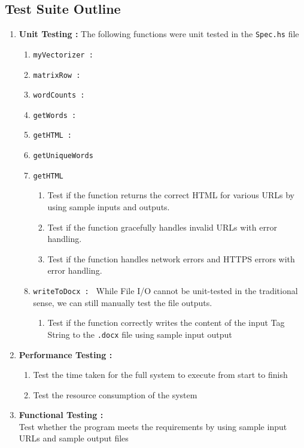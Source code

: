 \documentclass[12pt]{scrreprt}
\newcommand{\ttt}[1]{\texttt{#1}}
\begin{document}



\subsection{Test Suite Outline}

\begin{enumerate}
    \item \textbf{Unit Testing : } The following functions were unit tested in the \ttt{Spec.hs} file
    \begin{enumerate}
        \item \ttt{myVectorizer : }
        \item \ttt{matrixRow : }
        \item \ttt{wordCounts : }
        \item \ttt{getWords : }
        \item \texttt{getHTML : }
        \item \ttt{getUniqueWords}
        \item \ttt{getHTML}
        \begin{enumerate}
            \item Test if the function returns the correct HTML for various URLs by using sample inputs and outputs.
            \item Test if the function gracefully handles invalid URLs with error handling.
            \item Test if the function handles network errors and HTTPS errors with error handling.
        \end{enumerate}

        \item \texttt{writeToDocx : }
        While File I/O cannot be unit-tested in the traditional sense, we can still manually test the file outputs.
        \begin{enumerate}
            \item Test if the function correctly writes the content of the input Tag String to the \texttt{.docx} file using sample input output
        \end{enumerate}

    \end{enumerate}

    \item \textbf{Performance Testing : } 
    \begin{enumerate}
        \item Test the time taken for the full system to execute from start to finish
        \item Test the resource consumption of the system
    \end{enumerate}
    \item \textbf{Functional Testing : } \\ Test whether the program meets the requirements by using sample input URLs and sample output files
\end{enumerate}
\end{document}
